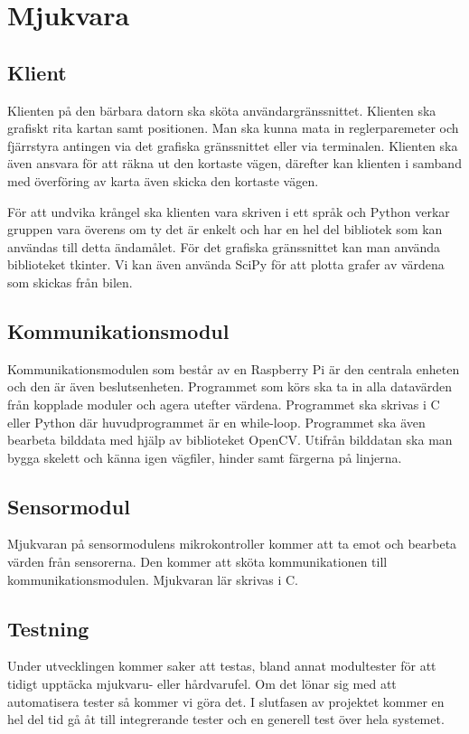 \documentclass[systemskiss/skiss.tex]{subfiles}
\begin{document}
\section{Mjukvara}
\subsection{Klient}
Klienten på den bärbara datorn ska sköta användargränssnittet. Klienten ska
grafiskt rita kartan samt positionen. Man ska kunna mata in reglerparemeter och
fjärrstyra antingen via det grafiska gränssnittet eller via terminalen.
Klienten ska även ansvara för att räkna ut den kortaste vägen, därefter kan
klienten i samband med överföring av karta även skicka den kortaste vägen.

För att undvika krångel ska klienten vara skriven i ett språk och Python verkar
gruppen vara överens om ty det är enkelt och har en hel del bibliotek som kan
användas till detta ändamålet. För det grafiska gränssnittet kan man använda
biblioteket tkinter. Vi kan även använda SciPy för att plotta grafer av värdena
som skickas från bilen.

\subsection{Kommunikationsmodul}
Kommunikationsmodulen som består av en Raspberry Pi är den centrala enheten och
den är även beslutsenheten. Programmet som körs ska ta in alla datavärden från
kopplade moduler och agera utefter värdena. Programmet ska skrivas i C eller
Python där huvudprogrammet är en while-loop. Programmet ska även bearbeta
bilddata med hjälp av biblioteket OpenCV. Utifrån bilddatan ska man bygga
skelett och känna igen vägfiler, hinder samt färgerna på linjerna.  

\subsection{Sensormodul}
Mjukvaran på sensormodulens mikrokontroller kommer att ta emot och bearbeta
värden från sensorerna. Den kommer att sköta kommunikationen till
kommunikationsmodulen. Mjukvaran lär skrivas i C.

\subsection{Testning}
Under utvecklingen kommer saker att testas, bland annat modultester för att
tidigt upptäcka mjukvaru- eller hårdvarufel. Om det lönar sig med att
automatisera tester så kommer vi göra det. I slutfasen av projektet kommer en
hel del tid gå åt till integrerande tester och en generell test över hela
systemet.
\end{document}
